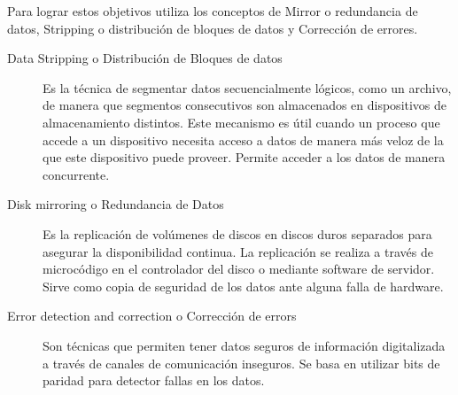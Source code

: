 \documentclass[a4paper, twoside]{article}
\begin{document}
Para lograr estos objetivos utiliza los conceptos de Mirror o redundancia de datos, Stripping o distribución de bloques de datos y Corrección de errores.

\begin{description}
	\item[Data Stripping o Distribución de Bloques de datos] Es la técnica de segmentar datos secuencialmente lógicos, como un archivo, de manera que segmentos consecutivos son almacenados en dispositivos de almacenamiento distintos. Este mecanismo es útil cuando un proceso que accede a un dispositivo necesita acceso a datos de manera más veloz de la que este dispositivo puede proveer. Permite acceder a los datos de manera concurrente.

	\item[Disk mirroring o Redundancia de Datos] Es la replicación de volúmenes de discos en discos duros separados para asegurar la disponibilidad continua. La replicación se realiza a través de microcódigo en el controlador del disco o mediante software de servidor. Sirve como copia de seguridad de los datos ante alguna falla de hardware.

	\item[Error detection and correction o Corrección de errors] Son técnicas que permiten tener datos seguros de información digitalizada a través de canales de comunicación inseguros. Se basa en utilizar bits de paridad para detector fallas en los datos.
\end{description}
\end{document}
